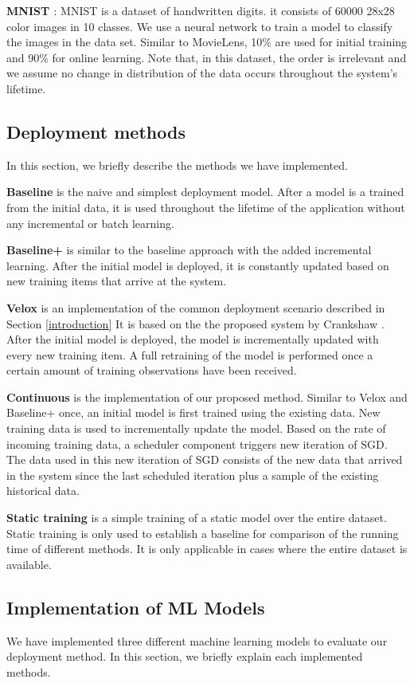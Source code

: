\documentclass{vldb}
\begin{document}
\textbf{MNIST \cite{lecun-mnist}}: MNIST is a dataset of handwritten digits.
it consists of 60000 28x28 color images in 10 classes. We use a neural network to train a model to classify the images in the data set. 
Similar to MovieLens, 10\% are used for initial training and 90\% for online learning. 
Note that, in this dataset, the order is irrelevant and we assume no change in distribution of the data occurs throughout the system's lifetime. 

\subsection{Deployment methods}
In this section, we briefly describe the methods we have implemented.

\textbf{Baseline} is the naive and simplest deployment model. 
After a model is a trained from the initial data, it is used throughout the lifetime of the application without any incremental or batch learning.

\textbf{Baseline+} is similar to the baseline approach with the added incremental learning.
After the initial model is deployed, it is constantly updated based on new training items that arrive at the system.

\textbf{Velox} is an implementation of the common deployment scenario described in Section \ref{introduction}
It is based on the the proposed system by Crankshaw \cite{crankshaw2014missing}. 
After the initial model is deployed, the model is incrementally updated with every new training item.
A full retraining of the model is performed once a certain amount of training observations have been received.

\textbf{Continuous} is the implementation of our proposed method. 
Similar to Velox and Baseline+ once, an initial model is first trained using the existing data.
New training data is used to incrementally update the model.
Based on the rate of incoming training data, a scheduler component triggers new iteration of SGD.
The data used in this new iteration of SGD consists of the new data that arrived in the system since the last scheduled iteration plus a sample of the existing historical data.

\textbf{Static training} is a simple training of a static model over the entire dataset. 
Static training is only used to establish a baseline for comparison of the running time of different methods.
It is only applicable in cases where the entire dataset is available.

\subsection{Implementation of ML Models}
We have implemented three different machine learning models to evaluate our deployment method.
In this section, we briefly explain each implemented methods.
\end{document}
